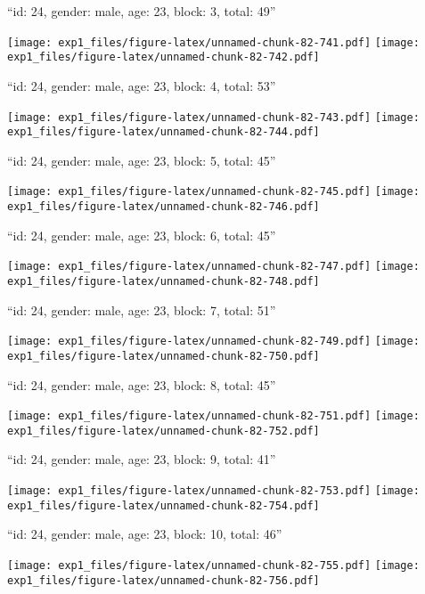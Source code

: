 \documentclass[11pt,,]{article}
\begin{document}
\newpage
[1] 

``id: 24, gender: male, age: 23, block: 3, total: 49''

\texttt{[image: exp1\_files/figure-latex/unnamed-chunk-82-741.pdf]}
\texttt{[image: exp1\_files/figure-latex/unnamed-chunk-82-742.pdf]}

\newpage
[1] 

``id: 24, gender: male, age: 23, block: 4, total: 53''

\texttt{[image: exp1\_files/figure-latex/unnamed-chunk-82-743.pdf]}
\texttt{[image: exp1\_files/figure-latex/unnamed-chunk-82-744.pdf]}

\newpage
[1] 

``id: 24, gender: male, age: 23, block: 5, total: 45''

\texttt{[image: exp1\_files/figure-latex/unnamed-chunk-82-745.pdf]}
\texttt{[image: exp1\_files/figure-latex/unnamed-chunk-82-746.pdf]}

\newpage
[1] 

``id: 24, gender: male, age: 23, block: 6, total: 45''

\texttt{[image: exp1\_files/figure-latex/unnamed-chunk-82-747.pdf]}
\texttt{[image: exp1\_files/figure-latex/unnamed-chunk-82-748.pdf]}

\newpage
[1] 

``id: 24, gender: male, age: 23, block: 7, total: 51''

\texttt{[image: exp1\_files/figure-latex/unnamed-chunk-82-749.pdf]}
\texttt{[image: exp1\_files/figure-latex/unnamed-chunk-82-750.pdf]}

\newpage
[1] 

``id: 24, gender: male, age: 23, block: 8, total: 45''

\texttt{[image: exp1\_files/figure-latex/unnamed-chunk-82-751.pdf]}
\texttt{[image: exp1\_files/figure-latex/unnamed-chunk-82-752.pdf]}

\newpage
[1] 

``id: 24, gender: male, age: 23, block: 9, total: 41''

\texttt{[image: exp1\_files/figure-latex/unnamed-chunk-82-753.pdf]}
\texttt{[image: exp1\_files/figure-latex/unnamed-chunk-82-754.pdf]}

\newpage
[1] 

``id: 24, gender: male, age: 23, block: 10, total: 46''

\texttt{[image: exp1\_files/figure-latex/unnamed-chunk-82-755.pdf]}
\texttt{[image: exp1\_files/figure-latex/unnamed-chunk-82-756.pdf]}
\end{document}

